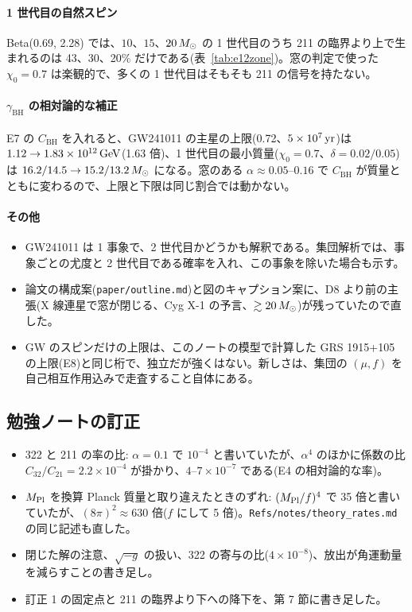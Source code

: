 \paragraph{1 世代目の自然スピン}
Beta(0.69, 2.28) では、$10$、$15$、$20\,M_\odot$ の 1 世代目のうち 211 の臨界より上で生まれるのは 43、30、20\% だけである(表~\ref{tab:e12zone})。窓の判定で使った $\chi_0=0.7$ は楽観的で、多くの 1 世代目はそもそも 211 の信号を持たない。

\paragraph{$\gamma_\mathrm{BH}$ の相対論的な補正}
E7 の $C_\mathrm{BH}$ を入れると、GW241011 の主星の上限(0.72、$5\times10^7\,\mathrm{yr}$)は $1.12\to1.83\times10^{12}\,\mathrm{GeV}$(1.63 倍)、1 世代目の最小質量($\chi_0=0.7$、$\delta=0.02/0.05$)は $16.2/14.5\to15.2/13.2\,M_\odot$ になる。窓のある $\alpha\approx0.05$--$0.16$ で $C_\mathrm{BH}$ が質量とともに変わるので、上限と下限は同じ割合では動かない。

\paragraph{その他}
\begin{itemize}
\item GW241011 は 1 事象で、2 世代目かどうかも解釈である。集団解析では、事象ごとの尤度と 2 世代目である確率を入れ、この事象を除いた場合も示す。
\item 論文の構成案(\texttt{paper/outline.md})と図のキャプション案に、D8 より前の主張(X 線連星で窓が閉じる、Cyg X-1 の予言、$\gtrsim20\,M_\odot$)が残っていたので直した。
\item GW のスピンだけの上限は、このノートの模型で計算した GRS 1915+105 の上限(E8)と同じ桁で、独立だが強くはない。新しさは、集団の $(\mu,f)$ を自己相互作用込みで走査すること自体にある。
\end{itemize}

\subsection{勉強ノートの訂正}

\begin{itemize}
\item 322 と 211 の率の比: $\alpha=0.1$ で $10^{-4}$ と書いていたが、$\alpha^4$ のほかに係数の比 $C_{32}/C_{21}=2.2\times10^{-4}$ が掛かり、$4$--$7\times10^{-7}$ である(E4 の相対論的な率)。
\item $M_\mathrm{Pl}$ を換算 Planck 質量と取り違えたときのずれ: $(M_\mathrm{Pl}/f)^4$ で 35 倍と書いていたが、$(8\pi)^2\approx630$ 倍($f$ にして 5 倍)。\texttt{Refs/notes/theory\_rates.md} の同じ記述も直した。
\item 閉じた解の注意、$\sqrt{-g}$ の扱い、322 の寄与の比($4\times10^{-8}$)、放出が角運動量を減らすことの書き足し。
\item 訂正 1 の固定点と 211 の臨界より下への降下を、第 7 節に書き足した。
\end{itemize}

